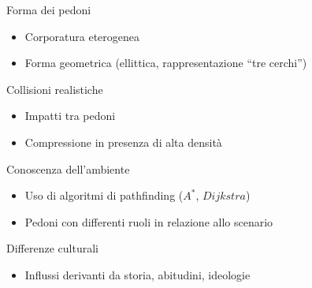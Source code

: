 \begin{block}{Forma dei pedoni}
    \begin{itemize}
        \item Corporatura eterogenea
        \item Forma geometrica (ellittica, rappresentazione ``tre cerchi'')
    \end{itemize}
\end{block}

\begin{block}{Collisioni realistiche}
    \begin{itemize}
        \item Impatti tra pedoni
        \item Compressione in presenza di alta densità
    \end{itemize}
\end{block}

\begin{block}{Conoscenza dell'ambiente}
    \begin{itemize}
        \item Uso di algoritmi di pathfinding ($A^*$, $Dijkstra$)
        \item Pedoni con differenti ruoli in relazione allo scenario
    \end{itemize}
\end{block}{}

\begin{block}{Differenze culturali}
    \begin{itemize}
        \item Influssi derivanti da storia, abitudini, ideologie
    \end{itemize}
\end{block}